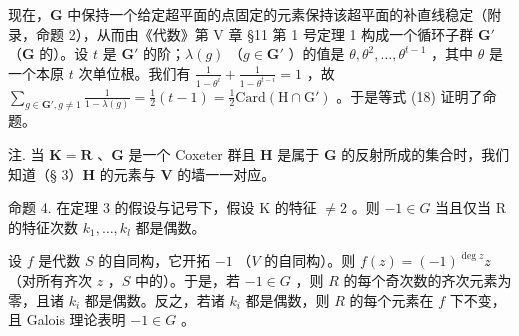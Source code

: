 现在，\(\mathbf{G}\) 中保持一个给定超平面的点固定的元素保持该超平面的补直线稳定（附录，命题 2），从而由《代数》第 V 章 §11 第 1 号定理 1 构成一个循环子群 \(\mathbf{G}'\) （\(\mathbf{G}\) 的）。设 \(t\) 是 \(\mathbf{G}'\) 的阶；\(\lambda(g)\) （\(g \in \mathbf{G}'\) ）的值是 \(\theta, \theta^2, \ldots, \theta^{t-1}\) ，其中 \(\theta\) 是一个本原 \(t\) 次单位根。我们有 \(\frac{1}{1-\theta^i} + \frac{1}{1-\theta^{t-i}} = 1\) ，故 \(\sum_{g \in \mathbf{G}', g \neq 1} \frac{1}{1-\lambda(g)} = \frac{1}{2}(t-1) = \frac{1}{2}\mathrm{Card}(\mathrm{H} \cap \mathrm{G}')\) 。于是等式 (18) 证明了命题。

注. 当 \(\mathbf{K} = \mathbf{R}\) 、\(\mathbf{G}\) 是一个 Coxeter 群且 \(\mathbf{H}\) 是属于 \(\mathbf{G}\) 的反射所成的集合时，我们知道（§ 3）\(\mathbf{H}\) 的元素与 \(\mathbf{V}\) 的墙一一对应。

命题 4. 在定理 3 的假设与记号下，假设 K 的特征 \(\neq 2\) 。则 \(-1 \in G\) 当且仅当 R 的特征次数 \(k_{1}, \ldots, k_{l}\) 都是偶数。

设 \(f\) 是代数 \(S\) 的自同构，它开拓 \(-1\) （\(V\) 的自同构）。则 \(f(z) = (-1)^{\deg z}z\) （对所有齐次 \(z\) ，\(S\) 中的）。于是，若 \(-1 \in G\) ，则 \(R\) 的每个奇次数的齐次元素为零，且诸 \(k_i\) 都是偶数。反之，若诸 \(k_i\) 都是偶数，则 \(R\) 的每个元素在 \(f\) 下不变，且 Galois 理论表明 \(-1 \in G\) 。

